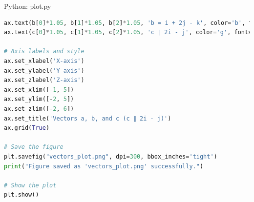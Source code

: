 \documentclass{beamer}
\numberwithin{equation}{section}
\theoremstyle{remark}
\begin{document}
\begin{frame}[fragile]{Python: plot.py}
\begin{lstlisting}[language=Python]
ax.text(b[0]*1.05, b[1]*1.05, b[2]*1.05, 'b = i + 2j - k', color='b', fontsize=10)
ax.text(c[0]*1.05, c[1]*1.05, c[2]*1.05, 'c ∥ 2i - j', color='g', fontsize=10)

# Axis labels and style
ax.set_xlabel('X-axis')
ax.set_ylabel('Y-axis')
ax.set_zlabel('Z-axis')
ax.set_xlim([-1, 5])
ax.set_ylim([-2, 5])
ax.set_zlim([-2, 6])
ax.set_title('Vectors a, b, and c (c ∥ 2i - j)')
ax.grid(True)

# Save the figure
plt.savefig("vectors_plot.png", dpi=300, bbox_inches='tight')
print("Figure saved as 'vectors_plot.png' successfully.")

# Show the plot
plt.show()

\end{lstlisting}
\end{frame}
\end{document}
